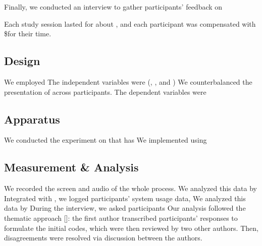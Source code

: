 Finally, we conducted an interview to gather participants' feedback on \xx

Each study session lasted for about \xx, and each participant was compensated with \$\xx for their time.

% 
\subsection{Design}
We employed %
% 
The independent variables were \xx (\xx, \xx, and \xx) %
We counterbalanced the presentation of \xx across participants.
% 
The dependent variables were \xx
% 

% 
\subsection{Apparatus}
We conducted the experiment on \xx %
that has %
We implemented \xx %
using \xx

% 
\subsection{Measurement \& Analysis}
We recorded the screen and audio of the whole process.
We analyzed this data by \xx
% 
Integrated with \xx, we logged participants' system usage data, \eg \xx
We analyzed this data by \xx
% 
During the interview, we asked participants \xx
Our analysis followed the thematic approach [\xx]: the first author transcribed participants' responses to formulate the initial codes, which were then reviewed by two other authors. Then, disagreements were resolved via discussion between the authors.